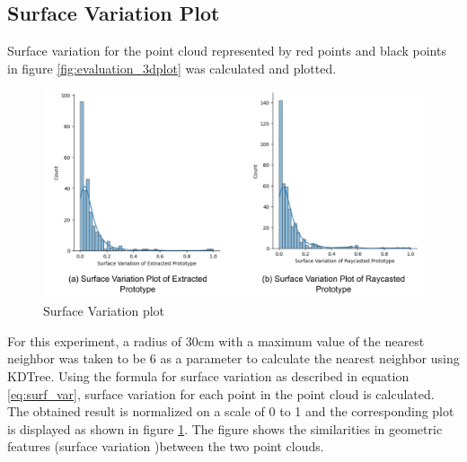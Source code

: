 \subsection{Surface Variation Plot}
Surface variation for the point cloud represented by red points and black points in figure \ref{fig:evaluation_3dplot} was calculated and plotted.

\begin{figure}[htbp]
    \centering
    \includegraphics[width=1\linewidth]{97_graphics/evaluation/sv_plots.pdf}
    \caption{Surface Variation plot}
    \label{fig:evaluation-sv_plots}
\end{figure}

For this experiment, a radius of 30cm with a maximum value of the nearest neighbor was taken to be 6 as a parameter to calculate the nearest neighbor using KDTree. Using the formula for surface variation as described in equation \ref{eq:surf_var}, surface variation for each point in the point cloud is calculated. The obtained result is normalized on a scale of 0 to 1 and the corresponding plot is displayed as shown in figure \ref{fig:evaluation-sv_plots}. The figure shows the similarities in geometric features (surface variation )between the two point clouds.


